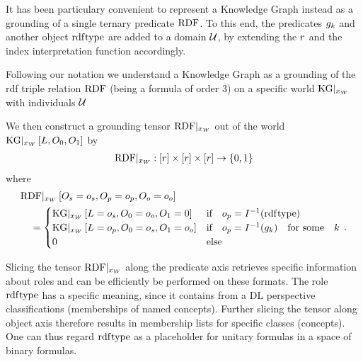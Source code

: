 \label{subsec:knowledgeGraphTernaryRep}

It has been particulary convenient to represent a Knowledge Graph instead as a grounding of a single ternary predicate $\mathrm{RDF}$.
To this end, the predicates $g_{k}$ and another object $\mathrm{rdf}\mathrm{type}$ are added to a domain $\mathcal{U}$, by extending the $r$ and the index interpretation function accordingly.


Following our notation we understand a Knowledge Graph as a grounding of the rdf triple relation $\mathrm{RDF}$ (being a formula of order 3) on a specific world $\mathrm{KG}|_{x_{W}}$ with individuals $\mathcal{U}$

We then construct a grounding tensor ${\mathrm{RDF}}|_{x_{W}}$ out of the world $\mathrm{KG}|_{x_{W}}\left[L,O_{0},O_{1}\right]$ by
\begin{align*}
    {\mathrm{RDF}}|_{x_{W}} : [r] \times [r] \times [r] \rightarrow \{0,1\}
\end{align*}
where
\begin{align*}
    &{\mathrm{RDF}}|_{x_{W}}\left[O_{s}=o_{s}, O_{p}=o_{p}, O_{o}=o_{o}\right] \\
    &\quad =
    \begin{cases}
        \mathrm{KG}|_{x_{W}}\left[L=o_{s},O_{0}=o_{o},O_{1}=0\right]
        & \text{if} \quad o_{p} = I^{-1}(\mathrm{rdf}\mathrm{type}) \\
        \mathrm{KG}|_{x_{W}}\left[L=o_{p},O_{0}=o_{s},O_{1}=o_{o}\right]
        & \text{if} \quad o_{p} = I^{-1}(g_{k}) \quad \text{for some} \quad k \\
        0  \quad & \text{else}
    \end{cases} \, .
\end{align*}


Slicing the tensor ${\mathrm{RDF}}|_{x_{W}}$ along the predicate axis retrieves specific information about roles and can be efficiently be performed on these formats.
The role $\mathrm{rdf}\mathrm{type}$ has a specific meaning, since it contains from a DL perspective classifications (memberships of named concepts).
Further slicing the tensor along object axis therefore results in membership lists for specific classes (concepts).
One can thus regard $\mathrm{rdf}\mathrm{type}$ as a placeholder for unitary formulas in a space of binary formulas.

